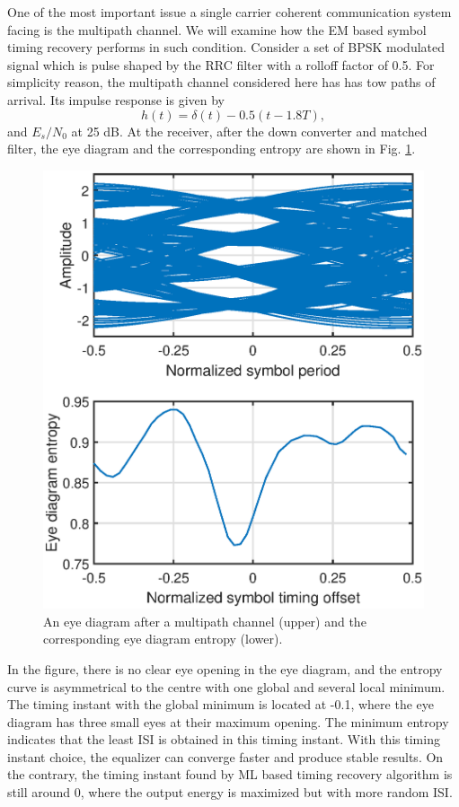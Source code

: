 \documentclass[journal,comsoc,onecolumn, 12pt,draftclsnofoot]{IEEEtran}
\begin{document}
One of the most important issue a single carrier coherent communication system facing is the multipath channel.
We will examine how the EM based symbol timing recovery performs in such condition.
Consider a set of BPSK modulated signal which is pulse shaped by the RRC filter with  a rolloff factor of 0.5.
For simplicity reason, the multipath channel considered here has has tow paths of arrival.
Its impulse response is given by
\begin{equation}
h(t)=\delta(t)-0.5(t-1.8T),
\end{equation}
and \(E_s/N_0\) at 25 dB.  
At the receiver, after the down converter and matched filter, the eye diagram and the corresponding entropy are shown in Fig. \ref{fig:per_timing_isi}. 
\begin{figure}[ht]
\centering
\includegraphics[width=3 in]{pic/per_timing_multi.eps}
\caption{An eye diagram after a multipath channel (upper) and the corresponding eye diagram entropy (lower).}
\label{fig:per_timing_isi} 
\end{figure} 

In the figure, there is no clear eye opening in the eye diagram, and the entropy curve is asymmetrical to the centre with one global and several local minimum. 
The timing instant with the global minimum is located at -0.1, where the eye diagram has three small eyes at their maximum opening.
The minimum entropy indicates that the least ISI is obtained in this timing instant.
With this timing instant choice, the equalizer can converge faster and produce stable results.
On the contrary, the timing instant found by ML based timing recovery algorithm is still around 0, 
where the output energy is maximized but with more random ISI.
\end{document}
